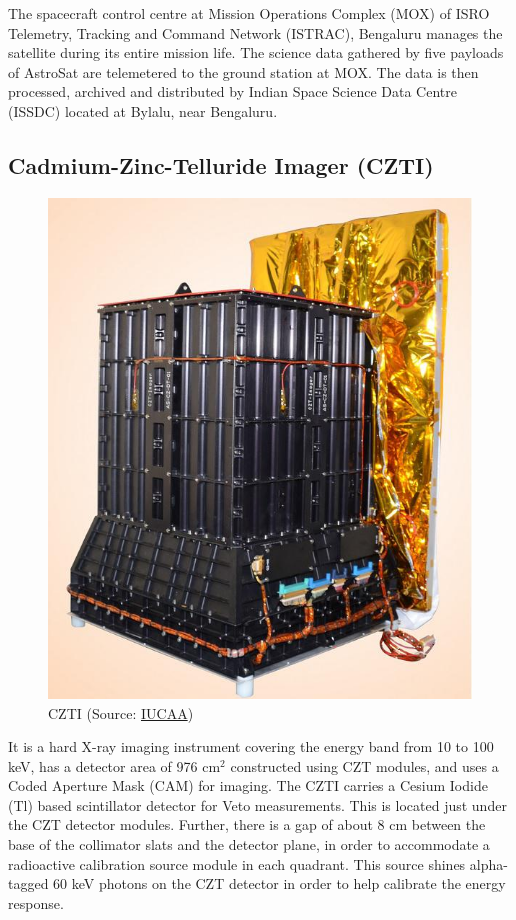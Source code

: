 \documentclass[11pt]{book} %
\begin{document}
The spacecraft control centre at Mission Operations Complex (MOX) of ISRO Telemetry, Tracking and Command Network (ISTRAC), Bengaluru manages the satellite during its entire mission life. The science data gathered by five payloads of AstroSat are telemetered to the ground station at MOX. The data is then processed, archived and distributed by Indian Space Science Data Centre (ISSDC) located at Bylalu, near Bengaluru.

\clearpage



\subsection{Cadmium-Zinc-Telluride Imager (CZTI)}


\begin{figure}
    \centering
    \includegraphics[scale=1]{Pictures/czti.jpg}
\caption{CZTI (Source: \href{http://astrosat.iucaa.in/czti/?q=home}{IUCAA})}
\end{figure}

It is a hard X-ray imaging instrument covering the energy band from 10 to 100 keV, has a detector area of 976 cm$^2$ constructed using CZT modules, and uses a Coded Aperture Mask (CAM) for imaging.
The CZTI carries a Cesium Iodide (Tl) based scintillator detector for Veto measurements. This is located just under the CZT detector modules. Further, there is a gap of about 8 cm between the base of the collimator slats and the detector plane, in order to accommodate a radioactive calibration source module in each quadrant. This source shines alpha-tagged 60 keV photons on the CZT detector in order to help calibrate the energy response.
\end{document}
